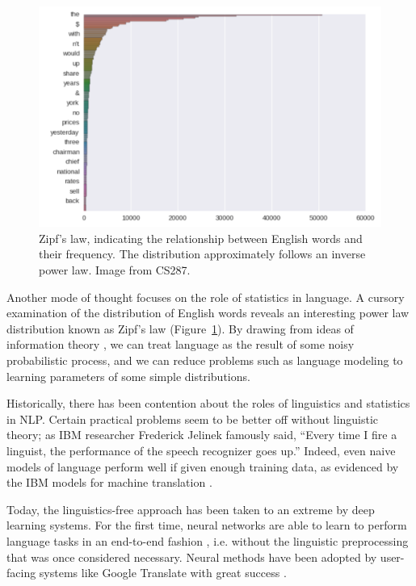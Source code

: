 \documentclass[12pt]{report}
\begin{document}
\begin{figure}[t]
\centering
\includegraphics[scale=0.5]{images/zipf}
\caption{Zipf's law, indicating the relationship between English words and their frequency. The distribution approximately follows an inverse power law. Image from CS287.}
\label{fig:zipf}
\end{figure}

Another mode of thought focuses on the role of statistics in language. A cursory examination of the distribution of English words reveals an interesting power law distribution known as Zipf's law (Figure~\ref{fig:zipf}). By drawing from ideas of information theory \citep{Shannon1948}, we can treat language as the result of some noisy probabilistic process, and we can reduce problems such as language modeling to learning parameters of some simple distributions.

Historically, there has been contention about the roles of linguistics and statistics in NLP. Certain practical problems seem to be better off without linguistic theory; as IBM researcher Frederick Jelinek famously said, ``Every time I fire a linguist, the performance of the speech recognizer goes up.''  Indeed, even naive models of language perform well if given enough training data, as evidenced by the IBM models for machine translation \citep{Brown1993}.

Today, the linguistics-free approach has been taken to an extreme by deep learning systems. For the first time, neural networks are able to learn to perform language tasks in an end-to-end fashion \citep{Collobert2011}, i.e. without the linguistic preprocessing that was once considered necessary.
Neural methods have been adopted by user-facing systems like Google Translate with great success \citep{GoogleTranslate2016}.
\end{document}
